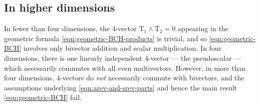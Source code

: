 \documentclass[12pt,a4paper]{article}
\makeatletter
\newcommand\x[1]{\@nameuse{\detokenize{#1}}}
\newcommand{\Ta}{\mathrm{T}_}
\makeatother
\begin{document}
\subsection{In higher dimensions}

In fewer than four dimensions, the $4$-vector $\Ta1\wedge\Ta2 = 0$ appearing in the geometric \x{BCH} formula \eqref{eqn:geometric-BCH-products} is trivial, and so \eqref{eqn:geometric-BCH} involves only bivector addition and scalar multiplication.
In four dimensions, there is one linearly independent $4$-vector --- the pseudoscalar --- which necessarily commutes with all even multivectors.
However, in more than four dimensions, $4$-vectors do \emph{not} necessarily commute with bivectors, and the assumptions underlying \eqref{eqn:arev-and-srev-parts} and hence the main result \eqref{eqn:geometric-BCH} fail.
\end{document}
